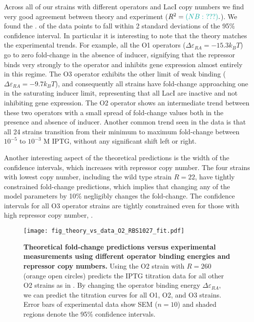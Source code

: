 Across all of our strains with different operators and LacI copy numbers we find very good agreement between theory and experiment ($R^2=\nathanComment{???}.$). We found the . of the data points to fall within 2 standard deviations of the 95\% confidence interval. In particular it is interesting to note that the theory matches the experimental trends. For example, all the O1 operators ($\Delta\varepsilon_{RA}=-15.3 k_B T$) go to zero fold-change in the absence of inducer, signifying that the repressor binds very strongly to the operator and inhibits gene expression almost entirely in this regime. The O3 operator exhibits the other limit of weak binding ($\Delta\varepsilon_{RA}=-9.7 k_B T$), and consequently all strains have fold-change approaching one in the saturating inducer limit, representing that all LacI are inactive and not inhibiting gene expression. The O2 operator shows an intermediate trend between these two operators with a small spread of fold-change values both in the presence and absence of inducer. Another common trend seen in the data is that all 24 strains transition from their minimum to maximum fold-change between $10^{-5}$ to $10^{-3} \,\, \text{M}$ IPTG, without any significant shift left or right.

Another interesting aspect of the theoretical predictions is the width of the confidence intervals, which increases with repressor copy number. The four strains with lowest copy number, including the wild type strain $R=22$, have tightly constrained fold-change predictions, which implies that changing any of the model parameters by 10\% negligibly changes the fold-change. The confidence intervals for all O3 operator strains are tightly constrained even for those with high repressor copy number, .


\begin{figure}[h!]
	\centering
	\texttt{[image: fig\_theory\_vs\_data\_O2\_RBS1027\_fit.pdf]}
	\caption{{\bf Theoretical fold-change predictions versus experimental measurements using different operator binding energies and repressor copy numbers.} Using the O2 strain with $R=260$ (orange open circles) predicts the IPTG titration data for all other O2 strains as in . By changing the operator binding energy $\Delta \varepsilon_{RA}$, we can predict the titration curves for all  O1,  O2, and  O3 strains. Error bars of experimental data show SEM ($n=10$) and shaded regions denote the 95\% confidence intervals.}
	\label{fig_result2}
\end{figure}

